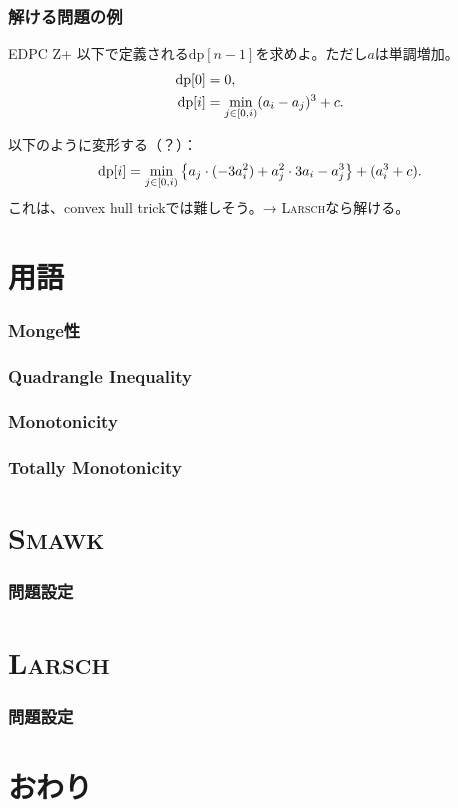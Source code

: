 \documentclass[
  lualatex,
  ja=standard,
  compress,
  hyperref={colorlinks, urlcolor=magenta, linkcolor=blue!55!black},
  dvipsnames,
  svgnames,
]{beamer}
\newcommand{\DP}{\mathrm{dp}}
\begin{document}
\begin{frame}
  \frametitle{解ける問題の例 \theslidetopic}

  \begin{block}{EDPC Z+}
    以下で定義される$\DP[n - 1]$を求めよ。ただし$a$は単調増加。
    $$
    \begin{aligned}
    \DP[0] &= 0, \\
    \DP[i] &= \min_{j\in\halfco{0}{i}} (a_i-a_j)^3+c. \\
    \end{aligned}
    $$
  \end{block}
  以下のように変形する（？）：
  $$
  \DP[i] = \min_{j\in\halfco{0}{i}} \left\{a_j\cdot (-3a_i^2)+a_j^2\cdot 3a_i-a_j^3\right\}+(a_i^3+c).
  $$
  これは、convex hull trickでは難しそう。→ \textsc{Larsch}なら解ける。
\end{frame}

\section{用語}
\begin{frame}
  \frametitle{Monge性}
\end{frame}

\begin{frame}
  \frametitle{Quadrangle Inequality}
\end{frame}

\begin{frame}
  \frametitle{Monotonicity}
\end{frame}

\begin{frame}
  \frametitle{Totally Monotonicity}
\end{frame}

\section{\textsc{Smawk}}
\begin{frame}
  \frametitle{問題設定}
\end{frame}

\section{\textsc{Larsch}}
\begin{frame}
  \frametitle{問題設定}
\end{frame}

\section{おわり}
\begin{frame}
  \vspace{3em}

  \Thankyou
\end{frame}
\end{document}
